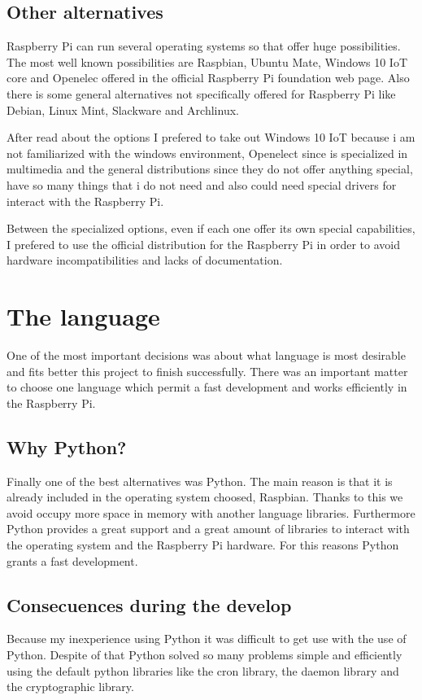 		\subsection{Other alternatives}
		Raspberry Pi can run several operating systems so that offer huge possibilities. The most well known possibilities are Raspbian, Ubuntu Mate, Windows 10 IoT core and Openelec offered in the official Raspberry Pi foundation web page. Also there is some general alternatives not specifically offered for Raspberry Pi like Debian, Linux Mint, Slackware and Archlinux. 

		After read about the options I prefered to take out Windows 10 IoT because i am not familiarized with the windows environment, Openelect since is specialized in multimedia and the general distributions since they do not offer anything special, have so many things that i do not need and also could need special drivers for interact with the Raspberry Pi.

		Between the specialized options, even if each one offer its own special capabilities, I prefered to use the official distribution for the Raspberry Pi in order to avoid hardware incompatibilities and lacks of documentation.
	\section{The language}
	One of the most important decisions was about what language is most desirable and fits better this project to finish successfully. There was an important matter to choose one language which permit a fast development and works efficiently in the Raspberry Pi.
		\subsection{Why Python?} %
		Finally one of the best alternatives was Python. The main reason is that it is already included in the operating system choosed, Raspbian. Thanks to this we avoid occupy more space in memory with another language libraries. 
		Furthermore Python provides a great support and a great amount of libraries to interact with the operating system and the Raspberry Pi hardware. 
		For this reasons Python grants a fast development.
		\subsection{Consecuences during the develop}
		Because my inexperience using Python it was difficult to get use with the use of Python. Despite of that Python solved so many problems simple and efficiently using the default python libraries like the cron library, the daemon library and the cryptographic library.
